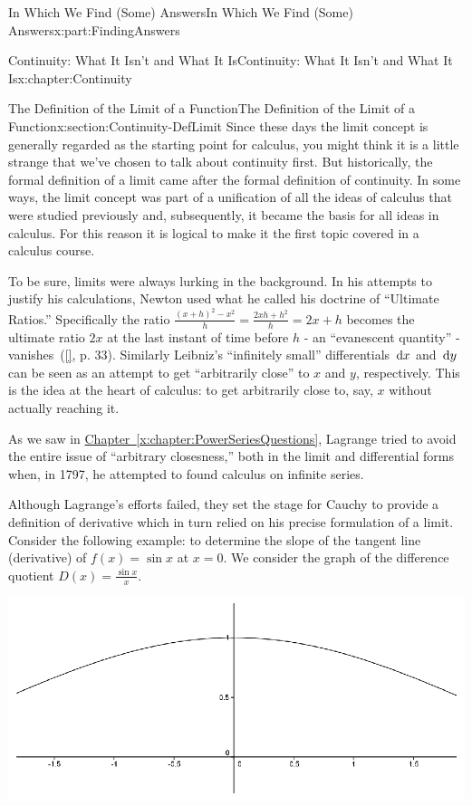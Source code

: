 \documentclass[oneside,10pt,]{book}
\newcommand{\xreffont}{\relax}
\numberwithin{equation}{section}
\newcommand{\dx}[1]{\,{\rm d}#1}
\begin{document}
\begin{partptx}{In Which We Find (Some) Answers}{}{In Which We Find (Some) Answers}{}{}{x:part:FindingAnswers}
\begin{chapterptx}{Continuity: What It Isn't and What It Is}{}{Continuity: What It Isn't and What It Is}{}{}{x:chapter:Continuity}
\begin{sectionptx}{The Definition of the Limit of a Function}{}{The Definition of the Limit of a Function}{}{}{x:section:Continuity-DefLimit}
Since these days the limit concept is generally regarded as the starting point for calculus, you might think it is a little strange that we've chosen to talk about continuity first. But historically, the formal definition of a limit came after the formal definition of continuity. In some ways, the limit concept was part of a unification of all the ideas of calculus that were studied previously and, subsequently, it became the basis for all ideas in calculus. For this reason it is logical to make it the first topic covered in a calculus course.%
\par
To be sure, limits were always lurking in the background. In his attempts to justify his calculations, Newton  used what he called his doctrine of ``Ultimate Ratios.'' Specifically the ratio \(\frac{(x+h)^2-x^2}{h} = \frac{2xh+h^2}{h} = 2x+h\) becomes the ultimate ratio \(2x\) at the last instant of time before \(h\) - an ``evanescent quantity'' - vanishes~(\hyperlink{x:biblio:grabiner81__origin_cauch_rigor_calculy}{[{\xreffont 4}]}, p. 33). Similarly Leibniz's ``infinitely small'' differentials \(\dx{ x}\) and \(\dx{ y}\) can be seen as an attempt to get ``arbitrarily close'' to \(x\) and \(y\), respectively. This is the idea at the heart of calculus: to get arbitrarily close to, say, \(x\) without actually reaching it.%
\par
As we saw in \hyperref[x:chapter:PowerSeriesQuestions]{Chapter~{\xreffont\ref{x:chapter:PowerSeriesQuestions}}}, Lagrange  tried to avoid the entire issue of ``arbitrary closesness,'' both in the limit and differential forms when, in 1797, he attempted to found calculus on infinite series.%
\par
Although Lagrange's  efforts failed, they set the stage for Cauchy  to provide a definition of derivative which in turn relied on his precise formulation of a limit. Consider the following example: to determine the slope of the tangent line (derivative) of \(f(x) = \sin x\) at \(x=0\). We consider the graph of the difference quotient \(D(x) =\frac{\sin x }{x}\).%
\begin{image}{0.22}{0.56}{0.22}%
\includegraphics[width=\linewidth]{images/SinGraph.png}

\end{image}
\end{sectionptx}
\end{chapterptx}
\end{partptx}
\end{document}
